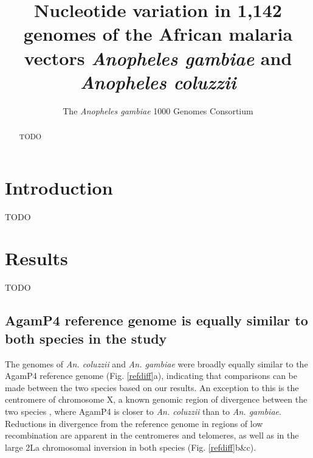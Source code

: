 \documentclass[a4paper,11pt,abstracton,hidelinks]{scrartcl}
\title{
Nucleotide variation in 1,142 genomes of the African malaria vectors \emph{Anopheles gambiae} and \emph{Anopheles coluzzii}
}
\author[1]{\small The \emph{Anopheles gambiae} 1000 Genomes Consortium}
\affil[1]{\footnotesize A list of consortium members appears at the end of the paper}
\begin{document}
\maketitle


\begin{abstract}

TODO

\end{abstract}


\section*{Introduction}

TODO


\section*{Results}

TODO

\subsection*{AgamP4 reference genome is equally similar to both species in the study}

The genomes of \textit{An. coluzzii} and \textit{An. gambiae} were broadly equally similar to the AgamP4 reference genome (Fig. \ref{refdiff}a), indicating that comparisons can be made between the two species based on our results.
%
An exception to this is the centromere of chromosome X, a known genomic region of divergence between the two species \cite{Ag1000gConsortium2017}, where AgamP4 is closer to \textit{An. coluzzii} than to \textit{An. gambiae}.
%
Reductions in divergence from the reference genome in regions of low recombination are apparent in the centromeres and telomeres, as well as in the large 2La chromosomal inversion in both species (Fig. \ref{refdiff}b\&c). 
\end{document}
